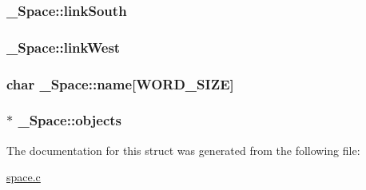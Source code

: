 \subsubsection[{\texorpdfstring{link\+South}{linkSouth}}]{ \+\_\+\+Space\+::link\+South}\hypertarget{struct__Space_a642c37093a6ccc0203a655c3fc0a93d3}{}\label{struct__Space_a642c37093a6ccc0203a655c3fc0a93d3}
\subsubsection[{\texorpdfstring{link\+West}{linkWest}}]{ \+\_\+\+Space\+::link\+West}\hypertarget{struct__Space_aaa6f5fa10a67afc466e3b272099dc398}{}\label{struct__Space_aaa6f5fa10a67afc466e3b272099dc398}
\subsubsection[{\texorpdfstring{name}{name}}]{\setlength{\rightskip}{0pt plus 5cm}char \+\_\+\+Space\+::name\mbox{[}{\bf W\+O\+R\+D\+\_\+\+S\+I\+ZE}\mbox{]}}\hypertarget{struct__Space_a4e8775f2ba9ae19392f9942dbb5f5ec0}{}\label{struct__Space_a4e8775f2ba9ae19392f9942dbb5f5ec0}
\subsubsection[{\texorpdfstring{objects}{objects}}]{$\ast$ \+\_\+\+Space\+::objects}\hypertarget{struct__Space_a661ed8b0fc8085b6db70188aa5085625}{}\label{struct__Space_a661ed8b0fc8085b6db70188aa5085625}


The documentation for this struct was generated from the following file\+:\begin{DoxyCompactItemize}
\item 
\hyperlink{space_8c}{space.\+c}\end{DoxyCompactItemize}

